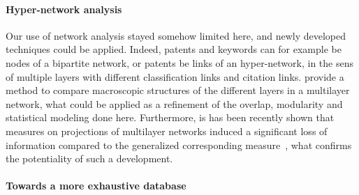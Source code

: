 \documentclass[10pt,A4]{article}
\begin{document}
\paragraph{Hyper-network analysis}






Our use of network analysis stayed somehow limited here, and newly developed techniques could be applied. Indeed, patents and keywords can for example be nodes of a bipartite network, or patents be links of an hyper-network, in the sens of multiple layers with different classification links and citation links. \cite{iacovacci2015mesoscopic} provide a method to compare macroscopic structures of the different layers in a multilayer network, what could be applied as a refinement of the overlap, modularity and statistical modeling done here. Furthermore, is has been recently shown that measures on projections of multilayer networks induced a significant loss of information compared to the generalized corresponding measure~\cite{de2015ranking}, what confirms the potentiality of such a development.





\paragraph{Towards a more exhaustive database}
\end{document}
